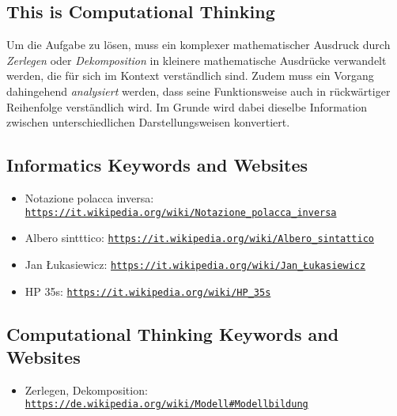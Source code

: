 \documentclass[a4paper,11pt]{report}
\newcommand{\BrochureUrlText}[1]{\texttt{#1}}
\begin{document}
\subsection*{This is Computational Thinking}

Um die Aufgabe zu lösen, muss ein komplexer mathematischer Ausdruck durch \emph{Zerlegen} oder \emph{Dekomposition} in kleinere mathematische Ausdrücke verwandelt werden, die für sich im Kontext verständlich sind. Zudem muss ein Vorgang dahingehend \emph{analysiert} werden, dass seine Funktionsweise auch in rückwärtiger Reihenfolge verständlich wird. Im Grunde wird dabei dieselbe Information zwischen unterschiedlichen Darstellungsweisen konvertiert.


\subsection*{Informatics Keywords and Websites}

\begin{itemize}
  \item Notazione polacca inversa: \href{https://it.wikipedia.org/wiki/Notazione_polacca_inversa}{\BrochureUrlText{https://it.wikipedia.org/wiki/Notazione\_polacca\_inversa}}
  \item Albero sintttico: \href{https://it.wikipedia.org/wiki/Albero_sintattico}{\BrochureUrlText{https://it.wikipedia.org/wiki/Albero\_sintattico}}
  \item Jan Łukasiewicz: \href{https://it.wikipedia.org/wiki/Jan_\%C5\%81ukasiewicz}{\BrochureUrlText{https://it.wikipedia.org/wiki/Jan\_Łukasiewicz}}
  \item HP 35s: \href{https://it.wikipedia.org/wiki/HP_35s}{\BrochureUrlText{https://it.wikipedia.org/wiki/HP\_35s}}
\end{itemize}


\subsection*{Computational Thinking Keywords and Websites}

\begin{itemize}
  \item Zerlegen, Dekomposition: \href{https://de.wikipedia.org/wiki/Modell\#Modellbildung}{\BrochureUrlText{https://de.wikipedia.org/wiki/Modell\#Modellbildung}}
\end{itemize}
\end{document}
